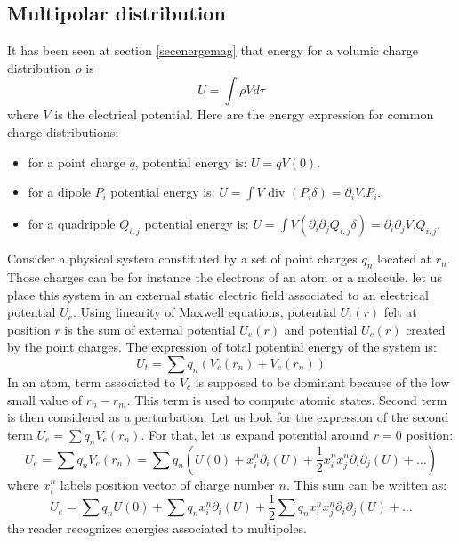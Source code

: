 \documentclass[12pt]{book}
\begin{document}
\subsection{Multipolar distribution}
It has been seen at section \ref{secenergemag} that energy for a volumic
charge distribution $\rho$ is
\begin{equation}
U=\int \rho V d\tau
\end{equation}
where $V$ is the electrical potential. Here are the energy expression for
common charge distributions:
\begin{itemize}
\item for a point charge $q$, potential energy is: $U=qV(0)$.
\item for a dipole
$P_i$ potential energy is: $U=\int V\mbox{ div }(P_i\delta)=\partial_i V.P_i$. 
\item for a quadripole $Q_{i,j}$ potential energy is: $U=\int
  V(\partial_i\partial_jQ_{i,j}\delta)=\partial_i\partial_j V.Q_{i,j}$. 
\end{itemize}
Consider a physical system constituted by a set of point charges $q_n$
located at $r_n$. Those charges can be for instance the electrons of an atom
or a molecule. let us place this system in an external static electric field
associated to an electrical potential $U_e$. Using linearity of Maxwell
equations, potential $U_t(r)$ felt at position $r$ is the sum of external
potential $U_e(r)$ and potential $U_c(r)$ created by the point charges. 
The expression of total potential energy of the system is:
\begin{equation}
U_t=\sum q_n (V_c(r_n)+V_e(r_n))
\end{equation}
In an atom, term associated to $V_c$ is supposed to be dominant
because of the low small value of $r_n-r_m$. This term is used to compute
atomic states. Second term is then considered as a perturbation. Let us look
for the expression of the second term $U_e=\sum q_n V_e(r_n)$. For that, let
us expand potential around $r=0$ position: 
\begin{equation}
U_e=\sum q_n V_e(r_n)=\sum q_n
(U(0) +x_i^n\partial_i(U)+
\frac{1}{2}x_i^nx_j^n\partial_i\partial_j(U)+\dots)
\end{equation}
where $x_i^n$ labels position vector of charge number $n$. 
This sum can be written as:
\begin{equation}
U_e=\sum q_n U(0)+\sum q_nx_i^n\partial_i(U)+\frac{1}{2}\sum
q_nx_i^nx_j^n\partial_i\partial_j(U)+\dots 
\end{equation}
the reader recognizes energies associated to multipoles.
\end{document}

